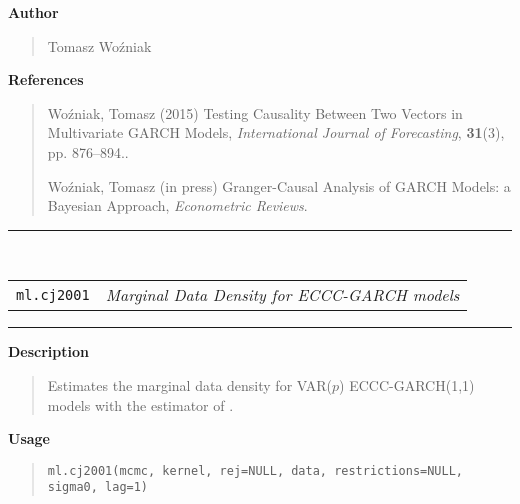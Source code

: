\documentclass[final,3p,authoryear]{elsarticle}
\begin{document}
\bigskip\noindent\textbf{Author}
\begin{quote}
Tomasz Wo\'zniak
\end{quote}


\bigskip\noindent\textbf{References}
\begin{quote}
\noindent Wo\'zniak, Tomasz (2015) Testing Causality Between Two Vectors in Multivariate GARCH Models, \emph{International Journal of Forecasting}, \textbf{31}(3), pp. 876--894..

\smallskip\noindent Wo\'zniak, Tomasz (in press) Granger-Causal Analysis of GARCH Models: a Bayesian Approach, \emph{Econometric Reviews}.

\end{quote}







\bigskip
\begin{center}
\rule{15cm}{.1pt}\\

\bigskip\begin{tabular}{p{2cm} l}
\texttt{ml.cj2001} & \textit{Marginal Data Density for ECCC-GARCH models} 
\end{tabular}

\smallskip
\rule{15cm}{.1pt}
\end{center}

\bigskip\noindent\textbf{Description}
\begin{quote}
Estimates the marginal data density for VAR($p$) ECCC-GARCH(1,1) models with the estimator of \cite{Chib2001}.
\end{quote}


\bigskip\noindent\textbf{Usage}
\begin{quote}
\begin{verbatim}
ml.cj2001(mcmc, kernel, rej=NULL, data, restrictions=NULL, sigma0, lag=1)
\end{verbatim}
\end{quote}
\end{document}
